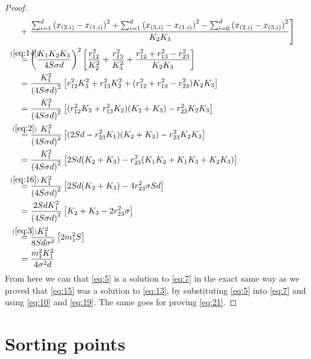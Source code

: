 \begin{proof}
\begin{align}
  &+ \left. \frac{ \sum_{i=1}^d {(x_{(2,i)} - x_{(1,i)})}^2 +
    \sum_{i=1}^d {(x_{(3,i)} - x_{(1,i)})}^2 -
    \sum_{i=0}^d {(x_{(2,i)} - x_{(3,i)})}^2}{K_2 K_3} \right] \\
  &\stackrel{\mathclap{(\ref{eq:14})}}{=}
    {\left( \frac{K_1 K_2 K_3}{4 S \sigma d} \right)}^2
    \left[ \frac{r_{12}^2}{K_2^2} + \frac{r_{13}^2}{K_3^2} +
    \frac{r_{12}^2 + r_{13}^2 - r_{23}^2}{K_2 K_3} \right] \\
  &= \frac{K_1^2}{{(4 S \sigma d)}^2}
    \left[ r_{12}^2 K_3^2 + r_{13}^2 K_2^2 +
    (r_{12}^2 + r_{13}^2 - r_{23}^2) K_2 K_3 \right] \\
  &= \frac{K_1^2}{{(4 S \sigma d)}^2}
    \left[ (r_{12}^2 K_3 + r_{13}^2 K_2) (K_2 + K_3) -
    r_{23}^2 K_2 K_3 \right] \\
  &\stackrel{\mathclap{(\ref{eq:2})}}{=}
    \frac{K_1^2}{{(4 S \sigma d)}^2}
    \left[ (2 S d - r_{23}^2 K_1) (K_2 + K_3) - r_{23}^2 K_2 K_3 \right] \\
  &= \frac{K_1^2}{{(4 S \sigma d)}^2}
    \left[ 2 S d (K_2 + K_3) - r_{23}^2 (K_1 K_2 + K_1 K_3 + K_2 K_3) \right] \\
  &\stackrel{\mathclap{(\ref{eq:16})}}{=}
    \frac{K_1^2}{{(4 S \sigma d)}^2}
    \left[ 2 S d (K_2 + K_3) - 4 r_{23}^2 \sigma S d \right] \\
  &= \frac{2 S d K_1^2}{{(4 S \sigma d)}^2}
    \left[ K_2 + K_3 - 2 r_{23}^2 \sigma \right] \\
  &\stackrel{\mathclap{(\ref{eq:3})}}{=}
    \frac{K_1^2}{8 S d \sigma^2}
    \left[ 2 m_1^2 S \right] \\
  &= \frac{m_1^2 K_1^2}{4 \sigma^2 d}
\end{align}
%
From here we can that \cref{eq:5} is a solution to \cref{eq:7} in the exact same way as
we proved that \cref{eq:15} was a solution to \cref{eq:13}, by substituting
\cref{eq:5} into \cref{eq:7} and using \cref{eq:10} and \cref{eq:19}. The same
goes for proving \cref{eq:21}.
\end{proof}

\section{Sorting points}
\label{sec:sorting-points}



